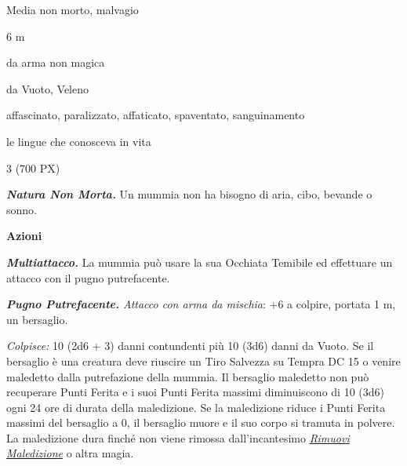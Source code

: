 \begin{multicols}{2}
{
\begin{description}[noitemsep, topsep=0pt, parsep=0pt, partopsep=0pt, itemsep=1pt, leftmargin=2.35cm,  labelwidth=2.2cm, itemindent=0cm, listparindent=0pt] %
\setlength{\baselineskip}{10pt}
\item[\textbf{Taglia/Tipo}] Media non morto, malvagio
\item[\textbf{Caratt.}] 
\item[\textbf{Punti Ferita}] 
\item[\textbf{Movimento}] 6 m
\item[\textbf{Tiri Salvez.}] 
\item[\textbf{Res. Danni}] da arma non magica
\item[\textbf{Imm. Danni}] da Vuoto, Veleno
\item[\textbf{Immunità}] affascinato, paralizzato, affaticato, spaventato, sanguinamento
\item[\textbf{Sensi}] 
\item[\textbf{Linguaggi}] le lingue che conosceva in vita
\item[\textbf{Sfida}] 3 (700 PX)
\end{description}
\smallskip

\emph{\textbf{Natura Non Morta.}} Un mummia non ha bisogno di aria, cibo, bevande o sonno.

\textbf{Azioni}

\emph{\textbf{Multiattacco.}} La mummia può usare la sua Occhiata Temibile ed effettuare un attacco con il pugno putrefacente.

\emph{\textbf{Pugno Putrefacente.} Attacco con arma da mischia}: +6 a colpire, portata 1 m, un bersaglio.

\emph{Colpisce:} 10 (2d6 + 3) danni contundenti più 10 (3d6) danni da Vuoto. Se il bersaglio è una creatura deve riuscire un Tiro Salvezza su Tempra DC 15 o venire maledetto dalla putrefazione della mummia. Il bersaglio maledetto non può recuperare Punti Ferita e i suoi Punti Ferita massimi diminuiscono di 10 (3d6) ogni 24 ore di durata della maledizione. Se la maledizione riduce i Punti Ferita massimi del bersaglio a 0, il bersaglio muore e il suo corpo si tramuta in polvere. La maledizione dura finché non viene rimossa dall'incantesimo \emph{\hyperlink{Rimuovi Maledizione}{Rimuovi Maledizione}} o altra magia.

}
\end{multicols}
